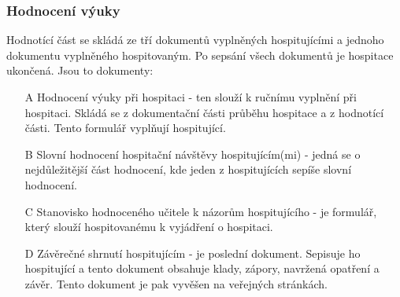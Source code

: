 \subsubsection{Hodnocení výuky}
Hodnotící část se skládá ze tří dokumentů vyplněných hospitujícími a jednoho dokumentu vyplněného hospitovaným. Po sepsání všech dokumentů je hospitace ukončená. Jsou to dokumenty:
\begin{itemize}
\item[A] Hodnocení výuky při hospitaci - ten slouží k ručnímu vyplnění při hospitaci. Skládá se z dokumentační části průběhu hospitace a z hodnotící části. Tento formulář vyplňují hospitující.
\item[B] Slovní hodnocení hospitační návštěvy hospitujícím(mi) - jedná se o nejdůležitější část hodnocení, kde jeden z hospitujících sepíše slovní hodnocení.
\item[C] Stanovisko hodnoceného učitele k názorům hospitujícího - je formulář, který slouží hospitovanému k vyjádření o hospitaci.
\item[D] Závěrečné shrnutí hospitujícím - je poslední dokument. Sepisuje ho hospitující a tento dokument obsahuje klady, zápory, navržená opatření a závěr. Tento dokument je pak vyvěšen na veřejných stránkách.
\end{itemize}